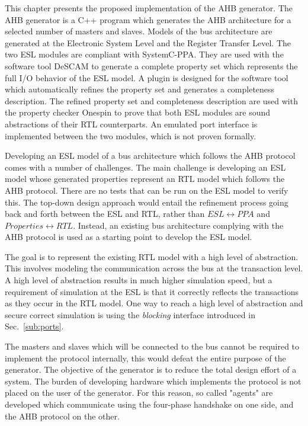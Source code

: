 \label{ch:impl}
This chapter presents the proposed implementation of the AHB generator. The AHB generator is a C++ program which generates the AHB architecture for a selected number of masters and slaves. Models of the bus architecture are generated at the Electronic System Level and the Register Transfer Level. The two ESL modules are compliant with SystemC-PPA. They are used with the software tool DeSCAM to generate a complete property set which represents the full I/O behavior of the ESL model. A plugin is designed for the software tool which automatically refines the property set and generates a completeness description. The refined property set and completeness description are used with the property checker Onespin to prove that both ESL modules are sound abstractions of their RTL counterparts. An emulated port interface is implemented between the two modules, which is not proven formally. \par
Developing an ESL model of a bus architecture which follows the AHB protocol comes with a number of challenges. The main challenge is developing an ESL model whose generated properties represent an RTL model which follows the AHB protocol. There are no tests that can be run on the ESL model to verify this. The top-down design approach would entail the refinement process going back and forth between the ESL and RTL, rather than $ESL\leftrightarrow PPA$ and $Properties\leftrightarrow RTL$. Instead, an existing bus architecture complying with the AHB protocol is used as a starting point to develop the ESL model. \par
The goal is to represent the existing RTL model with a high level of abstraction. This involves modeling the communication across the bus at the transaction level. A high level of abstraction results in much higher simulation speed, but a requirement of simulation at the ESL is that it correctly reflects the transactions as they occur in the RTL model. One way to reach a high level of abstraction and secure correct simulation is using the \textit{blocking} interface introduced in Sec.~\ref{sub:ports}. \par
The masters and slaves which will be connected to the bus cannot be required to implement the protocol internally, this would defeat the entire purpose of the generator. The objective of the generator is to reduce the total design effort of a system. The burden of developing hardware which implements the protocol is not placed on the user of the generator. For this reason, so called "agents" are developed which communicate using the four-phase handshake on one side, and the AHB protocol on the other. \par 
  

